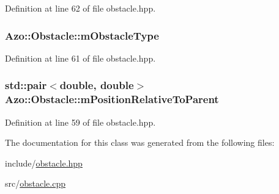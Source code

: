 Definition at line 62 of file obstacle.\+hpp.

\subsubsection[{\texorpdfstring{m\+Obstacle\+Type}{mObstacleType}}]{ Azo\+::\+Obstacle\+::m\+Obstacle\+Type}\hypertarget{class_azo_1_1_obstacle_aaab3518ffd0b5360643383a9199e7e7d}{}\label{class_azo_1_1_obstacle_aaab3518ffd0b5360643383a9199e7e7d}


Definition at line 61 of file obstacle.\+hpp.

\subsubsection[{\texorpdfstring{m\+Position\+Relative\+To\+Parent}{mPositionRelativeToParent}}]{\setlength{\rightskip}{0pt plus 5cm}std\+::pair$<$double, double$>$ Azo\+::\+Obstacle\+::m\+Position\+Relative\+To\+Parent}\hypertarget{class_azo_1_1_obstacle_aac3846345bf1ae1070d8b407fb4f7c3a}{}\label{class_azo_1_1_obstacle_aac3846345bf1ae1070d8b407fb4f7c3a}


Definition at line 59 of file obstacle.\+hpp.



The documentation for this class was generated from the following files\+:\begin{DoxyCompactItemize}
\item 
include/\hyperlink{obstacle_8hpp}{obstacle.\+hpp}\item 
src/\hyperlink{obstacle_8cpp}{obstacle.\+cpp}\end{DoxyCompactItemize}
